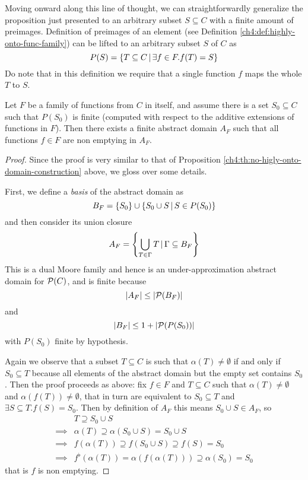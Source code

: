 Moving onward along this line of thought, we can straightforwardly generalize the proposition just presented to an arbitrary subset $S \subseteq C$ with a finite amount of preimages.
Definition of preimages of an element (see Definition \ref{ch4:def:highly-onto-func-family}) can be lifted to an arbitrary subset $S$ of $C$ as
\[
P(S) = \{ T \subseteq C \,\vert\, \exists f \in F. f(T) = S \}
\]
Do note that in this definition we require that a single function $f$ maps the whole $T$ to $S$.
\begin{prop}\label{ch4:th:existence-finte-backward}
	Let $F$ be a family of functions from $C$ in itself, and assume there is a set $S_0 \subseteq C$ such that $P(S_0)$ is finite (computed with respect to the additive extensions of functions in $F$). Then there exists a finite abstract domain $A_F$ such that all functions $f \in F$ are non emptying in $A_F$.
\end{prop}
\begin{proof}
	Since the proof is very similar to that of Proposition \ref{ch4:th:no-higly-onto-domain-construction} above, we gloss over some details.

	First, we define a \textit{basis} of the abstract domain as
	\[
	B_F = \{ S_0 \} \cup \{ S_0 \cup S \,\vert\, S \in P(S_0) \}
	\]
	and then consider its union closure
	\[
	A_F = \left\lbrace \bigcup\limits_{T \in \Gamma} T \,\vert\, \Gamma \subseteq B_F \right\rbrace
	\]
	This is a dual Moore family and hence is an under-approximation abstract domain for $\mathcal{P}(C)$, and is finite because
	\[
	\lvert A_F\rvert \le \lvert\mathcal{P}(B_F)\rvert
	\]
	and
	\[
	\lvert B_F\rvert \le 1 + \lvert\mathcal{P}(P(S_0))\rvert
	\]
	with $P(S_0)$ finite by hypothesis.

	Again we observe that a subset $T \subseteq C$ is such that $\alpha(T) \neq \emptyset$ if and only if $S_0 \subseteq T$ because all elements of the abstract domain but the empty set contains $S_0$. Then the proof proceeds as above: fix $f \in F$ and $T \subseteq C$ such that $\alpha(T) \neq \emptyset$ and $\alpha(f(T)) \neq \emptyset$, that in turn are equivalent to $S_0 \subseteq T$ and $\exists S \subseteq T. f(S) = S_0$. Then by definition of $A_F$ this means $S_0 \cup S \in A_F$, so
	\begin{align*}
		&T \supseteq S_0 \cup S \\
		\implies& \alpha(T) \supseteq \alpha(S_0 \cup S) = S_0 \cup S \\
		\implies& f(\alpha(T)) \supseteq f(S_0 \cup S) \supseteq f(S) = S_0 \\
		\implies& f^{\flat}(\alpha(T)) = \alpha(f(\alpha(T))) \supseteq \alpha(S_0) = S_0
	\end{align*}
	that is $f$ is non emptying.
\end{proof}

